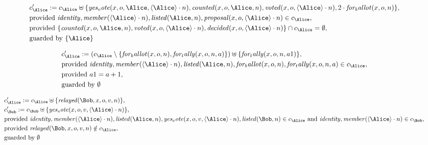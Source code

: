 \begin{align*}
&
c'_
{
\Alice
}
 := 
c_
{
\Alice
}
 \uplus 
\{
\mathit{
yes_vote
}
(
x
,
o
,
\Alice
,
\langle
\Alice
\rangle
\cdot
n
)
,
\mathit{
counted
}
(
x
,
o
,
\Alice
,
n
)
,
\mathit{
voted
}
(
x
,
o
,
\langle
\Alice
\rangle
\cdot
n
)
,
2
\cdot
\mathit{
for_ballot
}
(
x
,
o
,
n
)
\}
,\\
&
\text{provided } 
\mathit{
identity
}
,
\mathit{
member
}
(
\langle
\Alice
\rangle
\cdot
n
)
,
\mathit{
listed
}
(
\Alice
,
n
)
,
\mathit{
proposal
}
(
x
,
o
,
\langle
\Alice
\rangle
\cdot
n
)
 \in c_
{
\Alice
}
,\\
&
\text{provided } 
\{
\mathit{
counted
}
(
x
,
o
,
\Alice
,
n
)
,
\mathit{
voted
}
(
x
,
o
,
\langle
\Alice
\rangle
\cdot
n
)
,
\mathit{
decided
}
(
x
,
o
,
\langle
\Alice
\rangle
\cdot
n
)
\}
 \cap c_
{
\Alice
}
 = \emptyset
,\\
&
\text{guarded by } \{
\Alice
\}
\end{align*}

\begin{align*}
&
c'_
{
\Alice
}
 := 
(c_
{
\Alice
}
 \setminus 
\{
\mathit{
for_ballot
}
(
x
,
o
,
n
)
,
\mathit{
for_tally
}
(
x
,
o
,
n
,
a
)
\}
) \uplus 
\{
\mathit{
for_tally
}
(
x
,
o
,
n
,
a1
)
\}
,\\
&
\text{provided } 
\mathit{
identity
}
,
\mathit{
member
}
(
\langle
\Alice
\rangle
\cdot
n
)
,
\mathit{
listed
}
(
\Alice
,
n
)
,
\mathit{
for_ballot
}
(
x
,
o
,
n
)
,
\mathit{
for_tally
}
(
x
,
o
,
n
,
a
)
 \in c_
{
\Alice
}
,\\
&
\text{provided } 
a1
=
a
+ 1
,\\
&
\text{guarded by } \emptyset
\end{align*}

\begin{align*}
&
c'_
{
\Alice
}
 := 
c_
{
\Alice
}
 \uplus 
\{
\mathit{
relayed
}
(
\Bob
,
x
,
o
,
v
,
n
)
\}
,\\
&
c'_
{
\Bob
}
 := 
c_
{
\Bob
}
 \uplus 
\{
\mathit{
yes_vote
}
(
x
,
o
,
v
,
\langle
\Alice
\rangle
\cdot
n
)
\}
,\\
&
\text{provided } 
\mathit{
identity
}
,
\mathit{
member
}
(
\langle
\Alice
\rangle
\cdot
n
)
,
\mathit{
listed
}
(
\Alice
,
n
)
,
\mathit{
yes_vote
}
(
x
,
o
,
v
,
\langle
\Alice
\rangle
\cdot
n
)
,
\mathit{
listed
}
(
\Bob
,
n
)
 \in c_
{
\Alice
}
 \text{ and } 
\mathit{
identity
}
,
\mathit{
member
}
(
\langle
\Alice
\rangle
\cdot
n
)
 \in c_
{
\Bob
}
,\\
&
\text{provided } 
\mathit{
relayed
}
(
\Bob
,
x
,
o
,
v
,
n
)
 \notin c_
{
\Alice
}
,\\
&
\text{guarded by } \emptyset
\end{align*}
